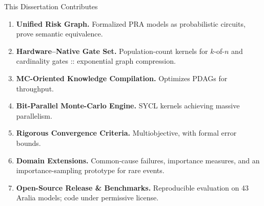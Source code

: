 

\begin{frame}{This Dissertation Contributes}
\begin{enumerate}[<+->]
  \item \textbf{Unified Risk Graph.}  Formalized PRA models as probabilistic circuits, prove semantic equivalence.
  \item \textbf{Hardware–Native Gate Set.}  Population-count kernels for $k$-of-$n$ and cardinality gates :: exponential graph compression.
  \item \textbf{MC-Oriented Knowledge Compilation.}  Optimizes PDAGs for throughput.
  \item \textbf{Bit-Parallel Monte-Carlo Engine.}  SYCL kernels achieving massive parallelism.
  \item \textbf{Rigorous Convergence Criteria.}  Multiobjective, with formal error bounds.
  \item \textbf{Domain Extensions.}  Common-cause failures, importance measures, and an importance-sampling prototype for rare events.
  \item \textbf{Open-Source Release \& Benchmarks.}  Reproducible evaluation on 43 Aralia models; code under permissive license.
\end{enumerate}
\end{frame}